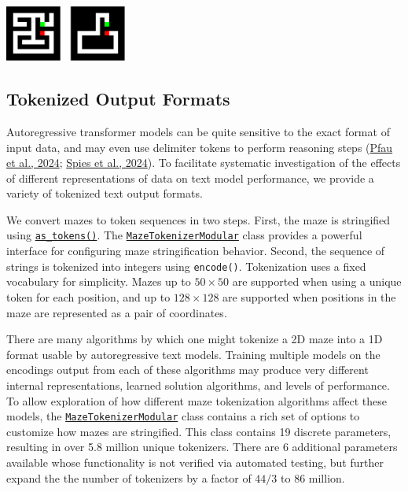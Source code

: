 \documentclass[10pt,a4paper,onecolumn]{article}
\let\origfigure\figure
\let\endorigfigure\endfigure
\renewenvironment{figure}[1][2] {
    \expandafter\origfigure\expandafter[H]
} {
    \endorigfigure
}
\begin{document}
\begin{figure}
\hypertarget{fig:e2h-raster}{%
\centering
\includegraphics[width=0.3\textwidth,height=\textheight]{figures/maze-raster-input-target.pdf}
\caption{Input is the rasterized maze without the path marked (left),
and provide as a target the maze with all but the correct path removed
(right). Configuration options exist to adjust whether endpoints are
included and if empty cells should be filled in.}\label{fig:e2h-raster}
}
\end{figure}

\hypertarget{sec:tokenized-output-formats}{%
\subsection{Tokenized Output
Formats}\label{sec:tokenized-output-formats}}

Autoregressive transformer models can be quite sensitive to the exact
format of input data, and may even use delimiter tokens to perform
reasoning steps (\protect\hyperlink{ref-pfau2024dotbydot}{Pfau et al.,
2024}; \protect\hyperlink{ref-spies2024causalworldmodels}{Spies et al.,
2024}). To facilitate systematic investigation of the effects of
different representations of data on text model performance, we provide
a variety of tokenized text output formats.

We convert mazes to token sequences in two steps. First, the maze is
stringified using
\href{https://understanding-search.github.io/maze-dataset/maze_dataset.html\#MazeDataset.as_tokens}{\texttt{as\_tokens()}}.
The
\href{https://understanding-search.github.io/maze-dataset/maze_dataset/tokenization.html\#MazeTokenizerModular}{\texttt{MazeTokenizerModular}}
class provides a powerful interface for configuring maze stringification
behavior. Second, the sequence of strings is tokenized into integers
using \texttt{encode()}. Tokenization uses a fixed vocabulary for
simplicity. Mazes up to \(50 \times 50\) are supported when using a
unique token for each position, and up to \(128 \times 128\) are
supported when positions in the maze are represented as a pair of
coordinates.

There are many algorithms by which one might tokenize a 2D maze into a
1D format usable by autoregressive text models. Training multiple models
on the encodings output from each of these algorithms may produce very
different internal representations, learned solution algorithms, and
levels of performance. To allow exploration of how different maze
tokenization algorithms affect these models, the
\href{https://understanding-search.github.io/maze-dataset/maze_dataset/tokenization.html\#MazeTokenizerModular}{\texttt{MazeTokenizerModular}}
class contains a rich set of options to customize how mazes are
stringified. This class contains 19 discrete parameters, resulting in
over 5.8 million unique tokenizers. There are 6 additional parameters
available whose functionality is not verified via automated testing, but
further expand the the number of tokenizers by a factor of \(44/3\) to
86 million.
\end{document}
